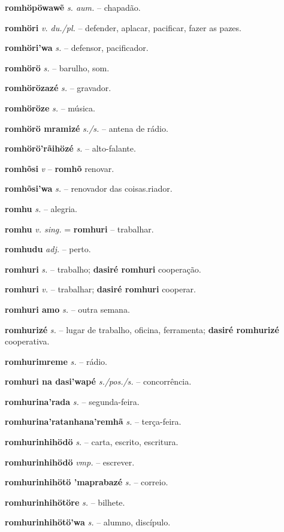\textbf{romhöpöwawẽ} \textit{s. aum.} -- chapadão.

\textbf{romhöri} \textit{v. du./pl.} -- defender, aplacar, pacificar, fazer as pazes.

\textbf{romhöri'wa} \textit{s.} -- defensor, pacificador.

\textbf{romhörö} \textit{s.} -- barulho, som.

\textbf{romhörözazé} \textit{s.} -- gravador.

\textbf{romhöröze} \textit{s.} -- música.

\textbf{romhörö mramizé} \textit{s./s.} -- antena de rádio.

\textbf{romhörö'rãihözé} \textit{s.} -- alto-falante.

\textbf{romhõsi} \textit{v} -- \textbf{romhõ} renovar.

\textbf{romhõsi'wa} \textit{s.} -- renovador das coisas.riador.

\textbf{romhu} \textit{s.} -- alegria.

\textbf{romhu} \textit{v. sing.} = \textbf{romhuri} -- trabalhar.

\textbf{romhudu} \textit{adj.} -- perto.

\textbf{romhuri} \textit{s.} -- trabalho; \textbf{dasiré romhuri} cooperação.

\textbf{romhuri} \textit{v.} -- trabalhar; \textbf{dasiré romhuri} cooperar.

\textbf{romhuri amo} \textit{s.} -- outra semana.

\textbf{romhurizé} \textit{s.} -- lugar de trabalho, oficina, ferramenta; \textbf{dasiré romhurizé} cooperativa.

\textbf{romhurimreme} \textit{s.} -- rádio.

\textbf{romhuri na dasi'wapé} \textit{s./pos./s.} -- concorrência.

\textbf{romhurina'rada} \textit{s.} -- segunda-feira.

\textbf{romhurina'ratanhana'remhã} \textit{s.} -- terça-feira.

\textbf{romhurinhihödö} \textit{s.} -- carta, escrito, escritura.

\textbf{romhurinhihödö} \textit{vmp.} -- escrever.

\textbf{romhurinhihötö 'maprabazé} \textit{s.} -- correio.

\textbf{romhurinhihötöre} \textit{s.} -- bilhete.

\textbf{romhurinhihötö'wa} \textit{s.} -- alumno, discípulo.

